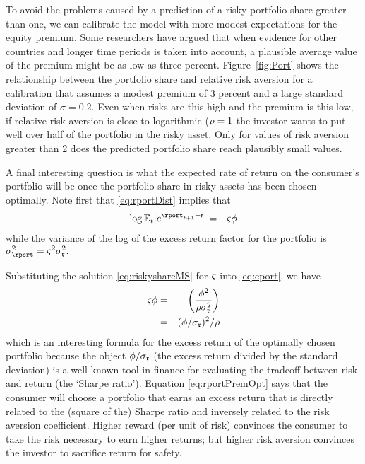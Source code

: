 To avoid the problems caused by a prediction of a risky portfolio
share greater than one, we can calibrate the model with more modest
expectations for the equity premium.  Some researchers have argued
that when evidence for other countries and longer time periods is
taken into account, a plausible average value of the premium might be
as low as three percent.  Figure~\ref{fig:Port} shows the relationship
between the portfolio share and relative risk aversion for a
calibration that assumes a modest premium of 3 percent and a large
standard deviation of $\sigma=0.2$.  Even when risks are this high and
the premium is this low, if relative risk aversion is close to
logarithmic ($\rho = 1$ the investor wants to put well over half of
the portfolio in the risky asset.  Only for values of risk aversion
greater than 2 does the predicted portfolio share reach plausibly
small values.



A final interesting question is what the expected rate of return on
the consumer's portfolio will be once the portfolio share in risky
assets has been chosen optimally.  Note first that \eqref{eq:rportDist}
implies that
\begin{eqnarray}
  \log \Ex_{t}[e^{\rport_{t+1}-\rfree}] & = & \riskyshare \eprem  \label{eq:eport}
\end{eqnarray}
while the variance of the log of the excess return factor for the portfolio is $\sigma^{2}_{\rport} = \riskyshare^{2} \sigma^{2}_{\risky}.$

Substituting the solution \eqref{eq:riskyshareMS} for ${\varsigma}$ into \eqref{eq:eport}, we have
\begin{eqnarray}
  {\varsigma} \phi & = & \left(\frac{\phi^{2}}{\rho \sigma_{\mathfrak{r}}^{2}}\right)  \notag
\\ & = &  (\phi/\sigma_{\mathfrak{r}})^{2}/\rho \label{eq:rportPremOpt}
\end{eqnarray}
which is an interesting formula for the excess return of the optimally
chosen portfolio because the object $\phi/\sigma_{\mathfrak{r}}$ (the
excess return divided by the standard deviation) is a well-known tool
in finance for evaluating the tradeoff between risk and return (the
`Sharpe ratio').  Equation \eqref{eq:rportPremOpt} says that the consumer will
choose a portfolio that earns an excess return that is directly
related to the (square of the) Sharpe ratio and inversely related to the risk aversion
coefficient.  Higher reward (per unit of risk) convinces the consumer
to take the risk necessary to earn higher returns; but higher risk
aversion convinces the investor to sacrifice return for safety.

